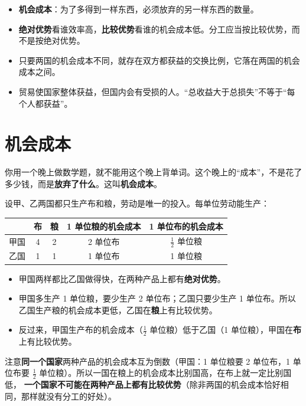
\begin{keypoints}
\begin{itemize}
  \item \textbf{机会成本}：为了多得到一样东西，必须放弃的另一样东西的数量。
  \item \textbf{绝对优势}看谁效率高，\textbf{比较优势}看谁的机会成本低。分工应当按比较优势，而不是按绝对优势。
  \item 只要两国的机会成本不同，就存在双方都获益的交换比例，它落在两国的机会成本之间。
  \item 贸易使国家整体获益，但国内会有受损的人。“总收益大于总损失”不等于“每个人都获益”。
\end{itemize}
\end{keypoints}

\section{机会成本}

你用一个晚上做数学题，就不能用这个晚上背单词。这个晚上的“成本”，不是花了多少钱，而是\textbf{放弃了什么}。这叫\textbf{机会成本}。

设甲、乙两国都只生产布和粮，劳动是唯一的投入。每单位劳动能生产：
\begin{center}
\small
\begin{tabular}{lcc|cc}
  \toprule
  & 布 & 粮 & 1 单位粮的机会成本 & 1 单位布的机会成本 \\
  \midrule
  甲国 & 4 & 2 & 2 单位布 & $\frac12$ 单位粮 \\
  乙国 & 1 & 1 & 1 单位布 & 1 单位粮 \\
  \bottomrule
\end{tabular}
\end{center}
\begin{itemize}
  \item 甲国两样都比乙国做得快，在两种产品上都有\textbf{绝对优势}。
  \item 甲国多生产 1 单位粮，要少生产 2 单位布；乙国只要少生产 1 单位布。所以乙国生产粮的机会成本更低，乙国在\textbf{粮}上有比较优势。
  \item 反过来，甲国生产布的机会成本（$\frac12$ 单位粮）低于乙国（1 单位粮），甲国在\textbf{布}上有比较优势。
\end{itemize}
注意\textbf{同一个国家}两种产品的机会成本互为倒数（甲国：1 单位粮要 2 单位布，1 单位布要 $\frac12$ 单位粮）。所以一国在粮上的机会成本比别国高，在布上就一定比别国低，
\textbf{一个国家不可能在两种产品上都有比较优势}（除非两国的机会成本恰好相同，那样就没有分工的好处）。

